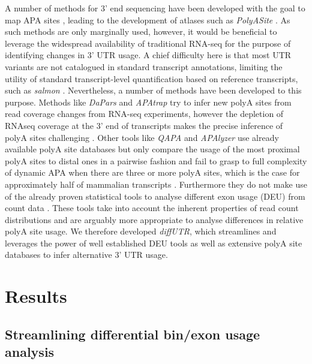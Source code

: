 \documentclass{bmcart}
\begin{document}
A number of methods for 3' end sequencing have been developed with the goal to map APA sites \cite{Fox-Walsh2011AFormation,Fu2011DifferentialSequencing,Zheng20163READS+RNA,Jan2011Formation3UTRs,Shepard2011ComplexPAS-Seq,Derti2012AMammals,Hwang2017CTag-PAPERCLIPActivation}, leading to the development of atlases such as \textit{PolyASite} \cite{Herrmann2020PolyASiteSequencing}. As such methods are only marginally used, however, it would be beneficial to leverage the widespread availability of traditional RNA-seq for the purpose of identifying changes in 3' UTR usage. A chief difficulty here is that most UTR variants are not catalogued in standard transcript annotations, limiting the utility of standard transcript-level quantification based on reference transcripts, such as \textit{salmon} \cite{PatroSalmon2017}. Nevertheless, a number of methods have been developed to this purpose. Methods like \textit{DaPars} \cite{Xia2014DynamicTypes} and \textit{APAtrap} \cite{Ye2018APAtrap:Data} try to infer new polyA sites from read coverage changes from RNA-seq experiments, however the depletion of RNAseq coverage at the 3' end of transcripts makes the precise inference of polyA sites challenging \cite{Wang2009RNA-Seq:Transcriptomics}. Other tools like \textit{QAPA} \cite{Ha2018QAPA:Data} and \textit{APAlyzer} \cite{Wang2020APAlyzer:Isoforms} use already available polyA site databases but only compare the usage of the most proximal polyA sites to distal ones in a pairwise fashion and fail to grasp to full complexity of dynamic APA when there are three or more polyA sites, which is the case for approximately half of mammalian transcripts \cite{Derti2012AMammals}. Furthermore they do not make use of the already proven statistical tools to analyse different exon usage (DEU) from count data \cite{Anders2012DetectingData,Robinson2009EdgeR:Data,Law2014Voom:Counts,Ritchie2015LimmaStudies}. These tools take into account the inherent properties of read count distributions and are arguably more appropriate to analyse differences in relative polyA site usage. We therefore developed \textit{diffUTR}, which streamlines and leverages the power of well established DEU tools as well as extensive polyA site databases to infer alternative 3' UTR usage.

\section*{Results}
\subsection*{Streamlining differential bin/exon usage analysis}
\end{document}

